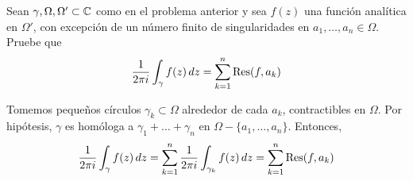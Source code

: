 \begin{exercise}
Sean $\gamma, \Omega, \Omega' \subset \mathbb C$ como en el problema anterior y sea $f(z)$ una función analítica en $\Omega'$, con excepción de un número finito de singularidades en $a_1, \dots, a_n \in \Omega$. Pruebe que
$$\frac 1 {2\pi i} \int_\gamma f(z) \, dz = \sum_{k=1}^n \operatorname{Res}(f,  a_k)$$
\end{exercise}

\begin{solution}
Tomemos pequeños círculos $\gamma_k \subset \Omega$ alrededor de cada $a_k$, contractibles en $\Omega$. Por hipótesis, $\gamma$ es homóloga a $\gamma_1 + \dots + \gamma_n$ en $\Omega - \{ a_1, \dots, a_n \}$. Entonces,
$$
\frac 1 {2\pi i} \int_\gamma f(z) \, dz
    = \sum_{k=1}^n \frac 1 {2\pi i} \int_{\gamma_k} f(z) \, dz
    = \sum_{k=1}^n \operatorname{Res}(f,  a_k)
$$
\end{solution}
